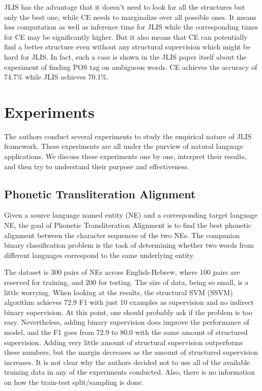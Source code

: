\documentclass{acm_proc_article-sp}
\begin{document}
JLIS has the advantage that it doesn't need to look for all the structures but only the best one, while CE needs to marginalize over all possible ones. It means less computation as well as inference time for JLIS while the corresponding times for CE may be significantly higher. But it also means that CE can potentially find a better structure even without any structural supervision which might be hard for JLIS. In fact, such a case is shown in the JLIS paper itself about the experiment of finding POS tag on ambiguous words. CE achieves the accuracy of 74.7\% while JLIS achieves 70.1\%.


\section{Experiments}
\label{sec:experiments}
The authors conduct several experiments to study the empirical nature of JLIS framework. These experiments are all under the purview of natural language applications. We discuss these experiments one by one, interpret their results, and then try to understand their purpose and effectiveness.

\subsection{Phonetic Transliteration Alignment}
\label{subsec:exp-transliteration}
Given a source language named entity (NE) and a corresponding target language NE, the goal of Phonetic Transliteration Alignment is to find the best phonetic alignment between the character sequences of the two NEs. The companion binary classification problem is the task of determining whether two words from different languages correspond to the same underlying entity.

The dataset is 300 pairs of NEs across English-Hebrew, where 100 pairs are reserved for training, and 200 for testing. The size of data, being so small, is a little worrying. When looking at the results, the structural SVM (SSVM) algorithm achieves 72.9 F1 with just 10 examples as supervision and no indirect binary supervision. At this point, one should probably ask if the problem is too easy. Nevertheless, adding binary supervision does improve the performance of model, and the F1 goes from 72.9 to 80.0 with the same amount of structured supervision. Adding very little amount of structural supervision outperforms these numbers, but the margin decreases as the amount of structured supervision increases. It is not clear why the authors decided not to use all of the available training data in any of the experiments conducted. Also, there is no information on how the train-test split/sampling is done.
\end{document}

